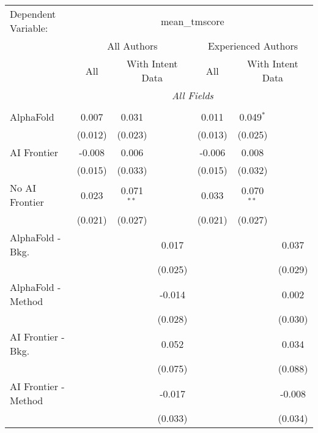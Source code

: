 \begingroup
\centering
\begin{tabular}{lcccccc}
   \tabularnewline \midrule \midrule
   Dependent Variable: & \multicolumn{6}{c}{mean\_tmscore}\\
 & \multicolumn{3}{c}{All Authors} & \multicolumn{3}{c}{Experienced Authors} \\
\cmidrule(lr){2-4} \cmidrule(lr){5-7}
 & \multicolumn{1}{c}{All} & \multicolumn{2}{c}{With Intent Data} & \multicolumn{1}{c}{All} & \multicolumn{2}{c}{With Intent Data} \\
\cmidrule(lr){2-2} \cmidrule(lr){3-4} \cmidrule(lr){5-5} \cmidrule(lr){6-7}
 & \multicolumn{6}{c}{\textit{All Fields}} \\ \\
   AlphaFold               & 0.007   & 0.031        &         & 0.011   & 0.049$^{*}$  &   \\   
                           & (0.012) & (0.023)      &         & (0.013) & (0.025)      &   \\   
   AI Frontier             & -0.008  & 0.006        &         & -0.006  & 0.008        &   \\   
                           & (0.015) & (0.033)      &         & (0.015) & (0.032)      &   \\   
   No AI Frontier          & 0.023   & 0.071$^{**}$ &         & 0.033   & 0.070$^{**}$ &   \\   
                           & (0.021) & (0.027)      &         & (0.021) & (0.027)      &   \\   
   AlphaFold - Bkg.        &         &              & 0.017   &         &              & 0.037\\   
                           &         &              & (0.025) &         &              & (0.029)\\   
   AlphaFold - Method      &         &              & -0.014  &         &              & 0.002\\   
                           &         &              & (0.028) &         &              & (0.030)\\   
   AI Frontier - Bkg.      &         &              & 0.052   &         &              & 0.034\\   
                           &         &              & (0.075) &         &              & (0.088)\\   
   AI Frontier - Method    &         &              & -0.017  &         &              & -0.008\\   
                           &         &              & (0.033) &         &              & (0.034)\\   

\end{tabular}
